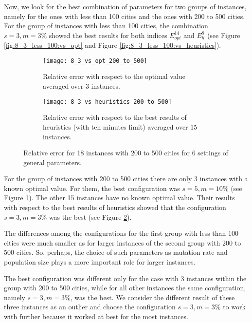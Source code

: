Now, we look for the best combination of parameters for two groups of instances, namely for the ones with less than 100 cities and the ones with 200 to 500 cities. For the group of instances with less than 100 cities, the combination $s = 3, m = 3\%$ showed the best results for both indices $E_{opt}^{14}$ and $E_{h}^{8}$ (see Figure \ref{fig:8_3_less_100:vs_opt} and Figure \ref{fig:8_3_less_100:vs_heuristics}). 

\begin{figure}[htp] \centering
	\begin{subfigure}[t]{0.45\textwidth}
		\texttt{[image: 8\_3\_vs\_opt\_200\_to\_500]}
		\caption{Relative error with respect to the optimal value averaged over 3 instances.}
		\label{fig:8_3_200_to_500:vs_opt}
	\end{subfigure}
	\hfill
	\begin{subfigure}[t]{0.45\textwidth}
		\centering
		\texttt{[image: 8\_3\_vs\_heuristics\_200\_to\_500]}
		\caption{Relative error with respect to the best results of heuristics (with ten minutes limit) averaged over 15 instances.}
		\label{fig:8_3_200_to_500:vs_heuristics}
	\end{subfigure}	
	\caption{Relative error for 18 instances with 200 to 500 cities for 6 settings of general parameters.}
	\label{fig:8_3_200_to_500}
\end{figure}

For the group of instances with 200 to 500 cities there are only 3 instances with a known optimal value. For them, the best configuration was $s = 5, m = 10\%$ (see Figure \ref{fig:8_3_200_to_500:vs_opt}). 
The other 15 instances have no known optimal value. Their results with respect to the best results of heuristics showed that the configuration $s = 3, m = 3\%$ was the best (see Figure \ref{fig:8_3_200_to_500:vs_heuristics}). \par

The differences among the configurations for the first group with less than 100 cities were much smaller as for larger instances of the second group with 200 to 500 cities. So, perhaps, the choice of such parameters as mutation rate and population size plays a more important role for larger instances.\par  

The best configuration was different only for the case with 3 instances within the group with 200 to 500 cities, while for all other instances the same configuration, namely $s = 3, m = 3\%$, was the best. We consider the different result of these three instances as an outlier and choose the configuration $s = 3, m = 3\%$ to work with further because it worked at best for the most instances. \par  

